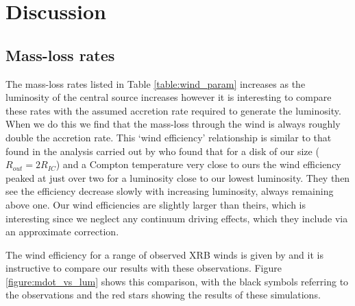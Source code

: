 \documentclass[a4paper,fleqn,usenatbib]{mnras}
\begin{document}



\section{Discussion}
\label{section:discussion}


\subsection{Mass-loss rates}

The mass-loss rates listed in Table \ref{table:wind_param} 
increases as the luminosity of the central source increases however it is interesting to compare
these rates with the assumed accretion rate required to generate the luminosity. When we do 
this we find that the mass-loss through the wind is always roughly double the accretion rate.
This `wind efficiency' relationship is similar to that found in the analysis carried out by \cite{2018MNRAS.473..838D}
who found that for a disk of our size ($R_{out}=2R_{IC}$) and a Compton temperature
very close to ours the wind efficiency peaked at just over two for a luminosity close to our lowest luminosity.
They then see the efficiency decrease slowly with increasing luminosity, 
always remaining above one. Our wind efficiencies are slightly larger than theirs, which is interesting since
we neglect any continuum driving effects, which they include via an approximate correction. 

The wind efficiency for a range of observed XRB winds is given by \cite{2012MNRAS.422L..11P} and
it is instructive to compare our results with these observations. Figure \ref{figure:mdot_vs_lum} shows 
this comparison, with the black symbols referring to the observations and the red stars showing the
results of these simulations. 
\end{document}
